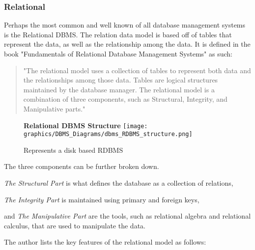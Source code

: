\documentclass[letterpaper, 12pt]{article}
\renewcommand{\includegraphics}[2][]{\fbox{}}
\begin{document}
\subsubsection{Relational}
Perhaps the most common and well known of all database management systems is the
Relational DBMS. The relation data model is based off of tables that represent 
the data, as well as the relationship among the data. It is defined in the book 
"Fundamentals of Relational Database Management Systems" as such:
\begin{quote}
"The relational model uses a collection of tables to represent both data and
the relationships among those data. Tables are logical structures maintained
by the database manager. The relational model is a combination of three
components, such as Structural, Integrity, and Manipulative parts."
\cite{sumathi2007fundamentals}
\end{quote}
\begin{figure}
  \centering
  \textbf{Relational DBMS Structure}
  \texttt{[image: graphics/DBMS\_Diagrams/dbms\_RDBMS\_structure.png]}
  \caption{Represents a disk based RDBMS}
\end{figure}
The three components can be further broken down.
\par\vspace{\baselineskip}
\textit{The Structural Part} is what defines the database as a collection of relations,
\par\vspace{\baselineskip}
\textit{The Integrity Part} is maintained using primary and foreign keys,
\par\vspace{\baselineskip}and 
\textit{The Manipulative Part} are the tools, such as relational algebra and 
relational calculus, that are used to manipulate the data.
\par\vspace{\baselineskip}
The author lists the key features of the relational model as follows: 
\end{document}
